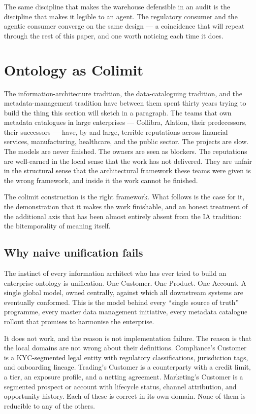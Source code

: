 \documentclass[11pt,a4paper]{article}
\begin{document}
The same discipline that makes the warehouse defensible in an audit is the discipline that makes it legible to an agent. The regulatory consumer and the agentic consumer converge on the same design --- a coincidence that will repeat through the rest of this paper, and one worth noticing each time it does.

\section{Ontology as Colimit}
\label{sec:colimit}

The information-architecture tradition, the data-cataloguing tradition, and the metadata-management tradition have between them spent thirty years trying to build the thing this section will sketch in a paragraph. The teams that own metadata catalogues in large enterprises --- Collibra, Alation, their predecessors, their successors --- have, by and large, terrible reputations across financial services, manufacturing, healthcare, and the public sector. The projects are slow. The models are never finished. The owners are seen as blockers. The reputations are well-earned in the local sense that the work has not delivered. They are unfair in the structural sense that the architectural framework these teams were given is the wrong framework, and inside it the work cannot be finished.

The colimit construction is the right framework. What follows is the case for it, the demonstration that it makes the work finishable, and an honest treatment of the additional axis that has been almost entirely absent from the IA tradition: the bitemporality of meaning itself.

\subsection{Why naive unification fails}

The instinct of every information architect who has ever tried to build an enterprise ontology is unification. One Customer. One Product. One Account. A single global model, owned centrally, against which all downstream systems are eventually conformed. This is the model behind every ``single source of truth'' programme, every master data management initiative, every metadata catalogue rollout that promises to harmonise the enterprise.

It does not work, and the reason is not implementation failure. The reason is that the local domains are not wrong about their definitions. Compliance's Customer is a KYC-segmented legal entity with regulatory classifications, jurisdiction tags, and onboarding lineage. Trading's Customer is a counterparty with a credit limit, a tier, an exposure profile, and a netting agreement. Marketing's Customer is a segmented prospect or account with lifecycle status, channel attribution, and opportunity history. Each of these is correct in its own domain. None of them is reducible to any of the others.
\end{document}

